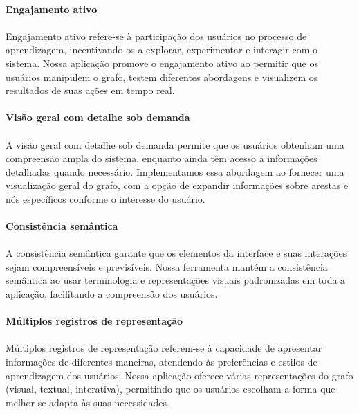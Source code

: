 \documentclass[12pt,a4paper]{article}
\begin{document}
\paragraph{Engajamento ativo}
\paragraph{}
Engajamento ativo refere-se à participação dos usuários no processo de aprendizagem, incentivando-os a explorar, experimentar e interagir com o sistema. Nossa aplicação promove o engajamento ativo ao permitir que os usuários manipulem o grafo, testem diferentes abordagens e visualizem os resultados de suas ações em tempo real.


\paragraph{Visão geral com detalhe sob demanda}
\paragraph{}
A visão geral com detalhe sob demanda permite que os usuários obtenham uma compreensão ampla do sistema, enquanto ainda têm acesso a informações detalhadas quando necessário. Implementamos essa abordagem ao fornecer uma visualização geral do grafo, com a opção de expandir informações sobre arestas e nós específicos conforme o interesse do usuário.

\paragraph{Consistência semântica}
\paragraph{}
A consistência semântica garante que os elementos da interface e suas interações sejam compreensíveis e previsíveis. Nossa ferramenta mantém a consistência semântica ao usar terminologia e representações visuais padronizadas em toda a aplicação, facilitando a compreensão dos usuários.

\paragraph{Múltiplos registros de representação}
\paragraph{}
Múltiplos registros de representação referem-se à capacidade de apresentar informações de diferentes maneiras, atendendo às preferências e estilos de aprendizagem dos usuários. Nossa aplicação oferece várias representações do grafo (visual, textual, interativa), permitindo que os usuários escolham a forma que melhor se adapta às suas necessidades.
\end{document}
